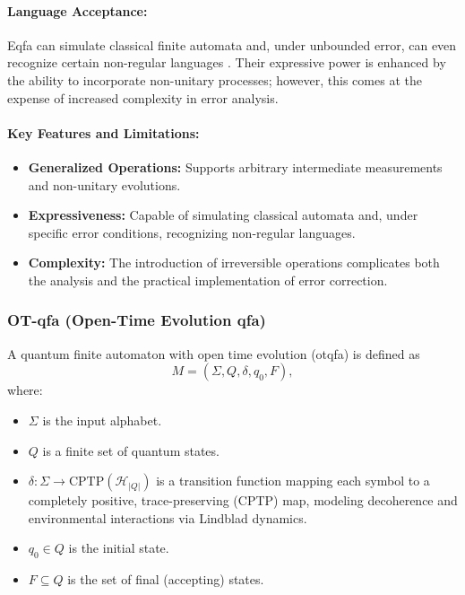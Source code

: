 \paragraph{Language Acceptance:}  
Eqfa can simulate classical finite automata and, under unbounded error, can even recognize certain non-regular languages \cite{nayak1999optimal}. Their expressive power is enhanced by the ability to incorporate non-unitary processes; however, this comes at the expense of increased complexity in error analysis.

\paragraph{Key Features and Limitations:}
\begin{itemize}
    \item \textbf{Generalized Operations:} Supports arbitrary intermediate measurements and non-unitary evolutions.
    \item \textbf{Expressiveness:} Capable of simulating classical automata and, under specific error conditions, recognizing non-regular languages.
    \item \textbf{Complexity:} The introduction of irreversible operations complicates both the analysis and the practical implementation of error correction.
\end{itemize}

\subsubsection{OT-qfa (Open-Time Evolution qfa)}
\label{sssec:ot-qfa}
\begin{definition}[OT-qfa]
A quantum finite automaton with open time evolution (\gls{otqfa}) is defined as 
\[
M = (\Sigma, Q, \delta, q_0, F),
\]
where:
\begin{itemize}
    \item \( \Sigma \) is the input alphabet.
    \item \( Q \) is a finite set of quantum states.
    \item \( \delta: \Sigma \to \text{CPTP}(\mathcal{H}_{|Q|}) \) is a transition function mapping each symbol to a completely positive, trace-preserving (CPTP) map, modeling decoherence and environmental interactions via Lindblad dynamics.
    \item \( q_0 \in Q \) is the initial state.
    \item \( F \subseteq Q \) is the set of final (accepting) states.
\end{itemize}
\end{definition}

